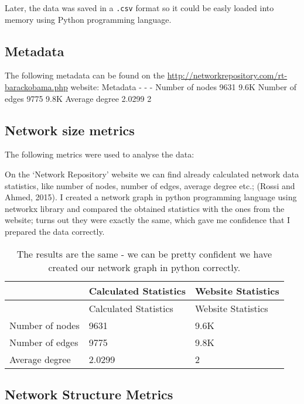 \documentclass[
]{article}
\begin{document}
Later, the data was saved in a \texttt{.csv} format so it could be easly
loaded into memory using Python programming language.

\hypertarget{metadata}{%
\subsection{Metadata}\label{metadata}}

The following metadata can be found on the
\url{http://networkrepository.com/rt-barackobama.php} website:
\textbar{} \textbar{} Metadata \textbar{} \textbar{} \textbar{} -
\textbar{} -\textbar{} - \textbar{} \textbar{} Number of nodes
\textbar{} 9631 \textbar{} 9.6K \textbar{} \textbar{} Number of edges
\textbar{} 9775 \textbar{} 9.8K \textbar{} \textbar{} Average degree
\textbar{} 2.0299 \textbar{} 2 \textbar{}

\hypertarget{network-size-metrics}{%
\subsection{Network size metrics}\label{network-size-metrics}}

The following metrics were used to analyse the data:

On the `Network Repository' website we can find already calculated
network data statistics, like number of nodes, number of edges, average
degree etc.; (Rossi and Ahmed, 2015). I created a network graph in
python programming language using networkx library and compared the
obtained statistics with the ones from the website; turns out they were
exactly the same, which gave me confidence that I prepared the data
correctly.

\begin{longtable}[]{@{}lll@{}}
\caption{The results are the same - we can be pretty confident we have
created our network graph in python correctly.}\tabularnewline
\toprule
& Calculated Statistics & Website Statistics\tabularnewline
\midrule
\endfirsthead
\toprule
& Calculated Statistics & Website Statistics\tabularnewline
\midrule
\endhead
Number of nodes & 9631 & 9.6K\tabularnewline
Number of edges & 9775 & 9.8K\tabularnewline
Average degree & 2.0299 & 2\tabularnewline
\bottomrule
\end{longtable}

\hypertarget{network-structure-metrics}{%
\subsection{Network Structure Metrics}\label{network-structure-metrics}}
\end{document}

